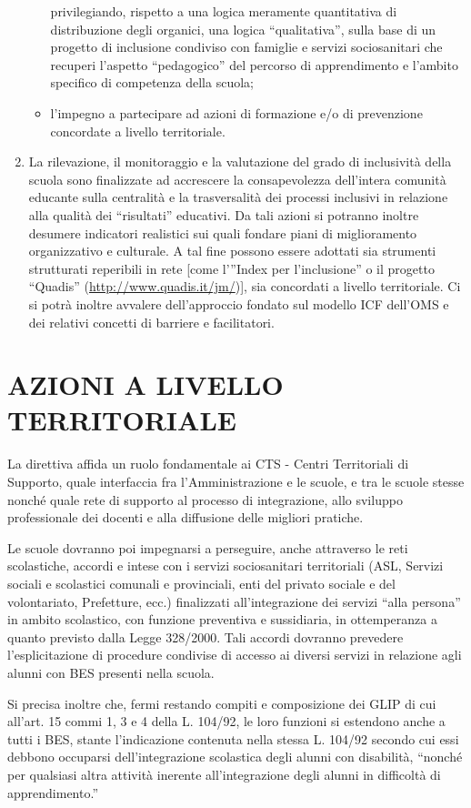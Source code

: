 \begin{enumerate}
\begin{itemize}
		privilegiando, rispetto a una logica meramente quantitativa di distribuzione degli
		organici, una logica “qualitativa”, sulla base di un progetto di inclusione condiviso con
		famiglie e servizi sociosanitari che recuperi l'aspetto “pedagogico” del percorso di
		apprendimento e l'ambito specifico di competenza della scuola;
		\item l'impegno a partecipare ad azioni di formazione e/o di prevenzione concordate a livello
		territoriale.
	\end{itemize}
	\item  La rilevazione, il monitoraggio e la valutazione del grado di inclusività della scuola sono
	finalizzate ad accrescere la consapevolezza dell'intera comunità educante sulla centralità e la
	trasversalità dei processi inclusivi in relazione alla qualità dei “risultati” educativi. Da tali azioni
	si potranno inoltre desumere indicatori realistici sui quali fondare piani di miglioramento
	organizzativo e culturale. A tal fine possono essere adottati sia strumenti strutturati reperibili in
	rete [come l’”Index per l'inclusione” o il progetto “Quadis” (\url{http://www.quadis.it/jm/})], sia
	concordati a livello territoriale. Ci si potrà inoltre avvalere dell'approccio fondato sul modello
	ICF dell'OMS e dei relativi concetti di barriere e facilitatori.
\end{enumerate}
\section*{AZIONI A LIVELLO TERRITORIALE}
La direttiva affida un ruolo fondamentale ai CTS - Centri Territoriali di Supporto, quale
interfaccia fra l'Amministrazione e le scuole, e tra le scuole stesse nonché quale rete di supporto al
processo di integrazione, allo sviluppo professionale dei docenti e alla diffusione delle migliori
pratiche.

Le scuole dovranno poi impegnarsi a perseguire, anche attraverso le reti scolastiche, accordi e
intese con i servizi sociosanitari territoriali (ASL, Servizi sociali e scolastici comunali e provinciali,
enti del privato sociale e del volontariato, Prefetture, ecc.) finalizzati all'integrazione dei servizi “alla
persona” in ambito scolastico, con funzione preventiva e sussidiaria, in ottemperanza a quanto
previsto dalla Legge 328/2000. Tali accordi dovranno prevedere l'esplicitazione di procedure
condivise di accesso ai diversi servizi in relazione agli alunni con BES presenti nella scuola.

Si precisa inoltre che, fermi restando compiti e composizione dei GLIP di cui all'art. 15 commi 1,
3 e 4 della L. 104/92, le loro funzioni si estendono anche a tutti i BES, stante l'indicazione contenuta
nella stessa L. 104/92 secondo cui essi debbono occuparsi dell'integrazione scolastica degli alunni
con disabilità, “nonché per qualsiasi altra attività inerente all'integrazione degli alunni in difficoltà di
apprendimento.”

